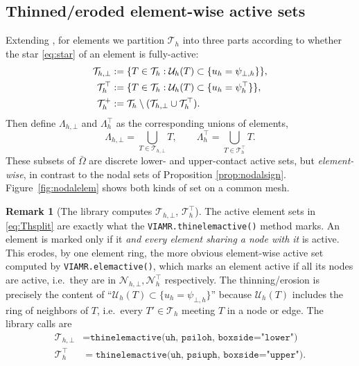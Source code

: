 \documentclass[12pt]{amsart}
\theoremstyle{definition}
\newtheorem{remark}{Remark}
\newcommand{\psiloh}{\psi_{\bot,h}}
\newcommand{\psiuph}{\psi^\top_h}
\newcommand{\Th}{\mathcal{T}_h}
\newcommand{\Nh}{\mathcal{N}_h}
\newcommand{\Uh}{\mathcal{U}_h}
\newcommand{\Thbot}{\mathcal{T}_{h,\bot}}
\newcommand{\Thtop}{\Th^\top}
\newcommand{\Thplus}{\Th^+}
\newcommand{\Nhbot}{\mathcal{N}_{h,\bot}}
\newcommand{\Nhtop}{\Nh^\top}
\newcommand{\Lamhbot}{\Lambda_{h,\bot}}
\newcommand{\Lamhtop}{\Lambda_h^\top}
\begin{document}
\subsection{Thinned/eroded element-wise active sets}

Extending \cite{NSV03}, for elements we partition $\Th$ into three parts according to whether the star \eqref{eq:star} of an element is fully-active:
\begin{align}
\label{eq:Thsplit}
  \Thbot &:= \{T \in \Th : \Uh(T) \subset \{u_h = \psiloh\}\}, \\
  \Thtop &:= \{T \in \Th : \Uh(T) \subset \{u_h = \psiuph\}\}, \notag \\
  \Thplus &:= \Th \setminus (\Thbot \cup \Thtop). \notag
\end{align}
Then define $\Lamhbot$ and $\Lamhtop$ as the corresponding unions of elements,
\begin{equation}
\Lamhbot = \bigcup_{T \in \Thbot} T, \qquad \Lamhtop = \bigcup_{T \in \Thtop} T.
\end{equation}
These subsets of $\bar\Omega$ are discrete lower- and upper-contact active sets, but \emph{element-wise}, in contrast to the nodal sets of Proposition \ref{prop:nodalsign}.
  Figure~\ref{fig:nodalelem} shows both kinds of set on a common mesh.



\begin{remark}[The library computes $\Thbot$, $\Thtop$]
\label{rem:thinactive}
The active element sets in \eqref{eq:Thsplit} are exactly what the \texttt{VIAMR.thinelemactive()} method marks.  An element is marked only if it \emph{and every element sharing a node with it} is active.  This erodes, by one element ring, the more obvious element-wise active set computed by \texttt{VIAMR.elemactive()}, which marks an element active if all its nodes are active, i.e.~they are in $\Nhbot,\Nhtop$ respectively.  The thinning/erosion is precisely the content of ``$\Uh(T) \subset \{u_h = \psiloh\}$'' because $\Uh(T)$ includes the ring of neighbors of $T$, i.e.~every $T' \in \Th$ meeting $T$ in a node or edge.  The library calls are
\begin{align*}
\Thbot &= \texttt{thinelemactive(uh, psiloh, boxside="lower")} \\
\Thtop &= \texttt{thinelemactive(uh, psiuph, boxside="upper")}.
\end{align*}
\end{remark}
\end{document}
